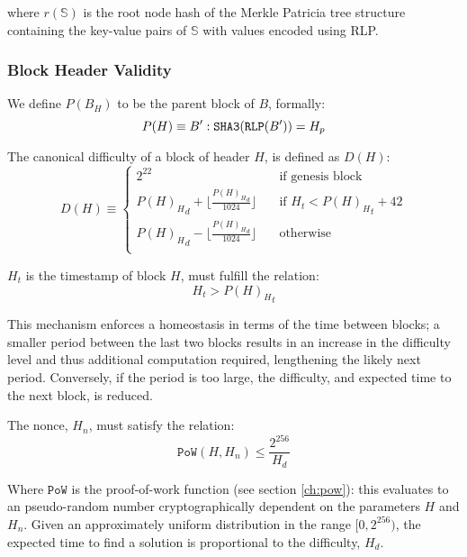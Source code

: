 \documentclass[9pt,oneside]{amsart}
\begin{document}
\begin{multicols}{2}
where $r(\mathbb{S})$ is the root node hash of the Merkle Patricia tree structure containing the key-value pairs of $\mathbb{S}$ with values encoded using RLP.

\subsubsection{Block Header Validity}

We define $P(B_H)$ to be the parent block of $B$, formally:
\begin{equation}
P(H) \equiv B': \mathtt{\tiny SHA3}(\mathtt{\tiny RLP}(B')) = H_p
\end{equation}

The canonical difficulty of a block of header $H$, is defined as $D(H)$:
\begin{equation}
D(H) \equiv \begin{cases}
2^{22} & \quad \text{if genesis block}\\
{P(H)_H}_d + \lfloor\frac{{P(H)_H}_d}{1024}\rfloor & \quad \text{if $H_t < {P(H)_H}_t + 42$}\\
{P(H)_H}_d - \lfloor\frac{{P(H)_H}_d}{1024}\rfloor & \quad \text{otherwise}\\
\end{cases}
\end{equation}

$H_t$ is the timestamp of block $H$, must fulfill the relation:
\begin{equation}
H_t > {P(H)_H}_t
\end{equation}

This mechanism enforces a homeostasis in terms of the time between blocks; a smaller period between the last two blocks results in an increase in the difficulty level and thus additional computation required, lengthening the likely next period. Conversely, if the period is too large, the difficulty, and expected time to the next block, is reduced.

The nonce, $H_n$, must satisfy the relation:
\begin{equation}
\mathtt{PoW}(H, H_n) \leqslant \frac{2^{256}}{H_d}
\end{equation}

Where $\mathtt{PoW}$ is the proof-of-work function (see section \ref{ch:pow}): this evaluates to an pseudo-random number cryptographically dependent on the parameters $H$ and $H_n$. Given an approximately uniform distribution in the range $[0, 2^{256})$, the expected time to find a solution is proportional to the difficulty, $H_d$.


\end{multicols}
\end{document}
